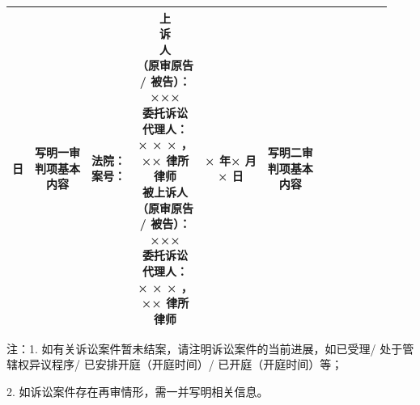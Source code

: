 {\begin{tabular}{|c|c|c|c|c|c|c|c|c|c|c|c|}
 日} & \makecell[l]{写明一审\\判项基本\\内容} & \makecell[l]{法院：\\案号：} & \makecell[l]{上\\诉\\人\\（原审原告\\/ 被告）：\\×××\\委托诉讼\\代理人：\\× × × ，\\×× 律所\\律师\\被上诉人\\（原审原告\\/ 被告）：\\×××\\委托诉讼\\代理人：\\× × × ，\\×× 律所\\律师} & \makecell{× 年× 月\\× 日} & \makecell[l]{写明二审\\判项基本\\内容} \\ \hline
\end{tabular}
}

\vspace{10bp}
\noindent\fontsize{8bp}{10bp}\selectfont 注：1. 如有关诉讼案件暂未结案，请注明诉讼案件的当前进展，如已受理/ 处于管辖权异议程序/ 已安排开庭（开庭时间）/ 已开庭（开庭时间）等；\par
\hspace*{1.5em} 2. 如诉讼案件存在再审情形，需一并写明相关信息。


